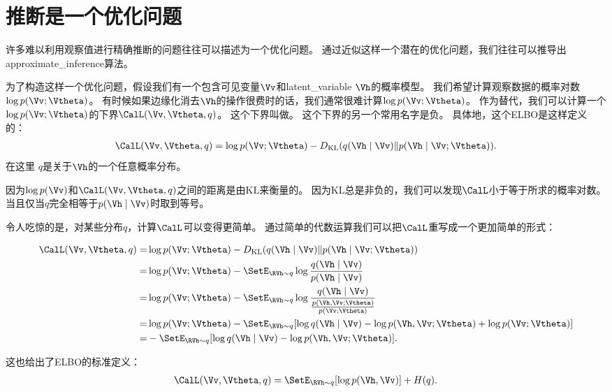 \section{推断是一个优化问题}
\label{sec:inference_as_optimization}

许多难以利用观察值进行精确推断的问题往往可以描述为一个优化问题。
通过近似这样一个潜在的优化问题，我们往往可以推导出\gls{approximate_inference}算法。


为了构造这样一个优化问题，假设我们有一个包含可见变量$\Vv$和\gls{latent_variable} $\Vh$的概率模型。
我们希望计算观察数据的概率对数$\log p(\Vv;\Vtheta)$。
有时候如果边缘化消去$\Vh$的操作很费时的话，我们通常很难计算$\log p(\Vv;\Vtheta)$。
作为替代，我们可以计算一个$\log p(\Vv;\Vtheta)$的下界$\CalL(\Vv,{\Vtheta},q)$。
这个下界叫做。
这个下界的另一个常用名字是负。
具体地，这个\gls{ELBO}是这样定义的：
\begin{align}
\CalL(\Vv,{\Vtheta},q) = \log p(\Vv;{\Vtheta}) - D_{\text{KL}}(q(\Vh\mid\Vv) \Vert p(\Vh\mid\Vv;{\Vtheta})).
\end{align}
在这里 $q$是关于$\Vh$的一个任意概率分布。


因为$\log p(\Vv)$和$\CalL(\Vv,{\Vtheta},q)$之间的距离是由\gls{KL}来衡量的。
因为\gls{KL}总是非负的，我们可以发现$\CalL$小于等于所求的概率对数。
当且仅当$q$完全相等于$p(\Vh\mid\Vv)$时取到等号。


令人吃惊的是，对某些分布$q$，计算$\CalL$可以变得更简单。
通过简单的代数运算我们可以把$\CalL$重写成一个更加简单的形式：

\begin{align}
\CalL(\Vv,{\Vtheta},q) = & \log p(\Vv;{\Vtheta})- D_{\text{KL}}(q(\Vh\mid\Vv)\Vert p(\Vh\mid\Vv;{\Vtheta})) \\
= & \log p(\Vv;{\Vtheta}) - \SetE_{\RVh\sim q}\log \frac{q(\Vh\mid\Vv)}{p(\Vh\mid\Vv)} \\
= & \log p(\Vv;{\Vtheta}) -  \SetE_{\RVh\sim q} \log \frac{q(\Vh\mid\Vv) }{ \frac{p(\Vh,\Vv;{\Vtheta})}{p(\Vv; {\Vtheta})} } \\
= & \log p(\Vv; {\Vtheta}) -  \SetE_{\RVh\sim q} [\log q(\Vh\mid\Vv) - \log {p(\Vh,\Vv; {\Vtheta})} + \log {p(\Vv; {\Vtheta})} ]\\
= & - \SetE_{\RVh\sim q}[\log q(\Vh\mid\Vv) - \log {p(\Vh,\Vv;{\Vtheta})}].
\end{align}


这也给出了\gls{ELBO}的标准定义：
\begin{align}
\CalL(\Vv,{\Vtheta},q) = \SetE_{\RVh\sim q}[\log p(\Vh , \Vv)] + H(q).
\end{align}


